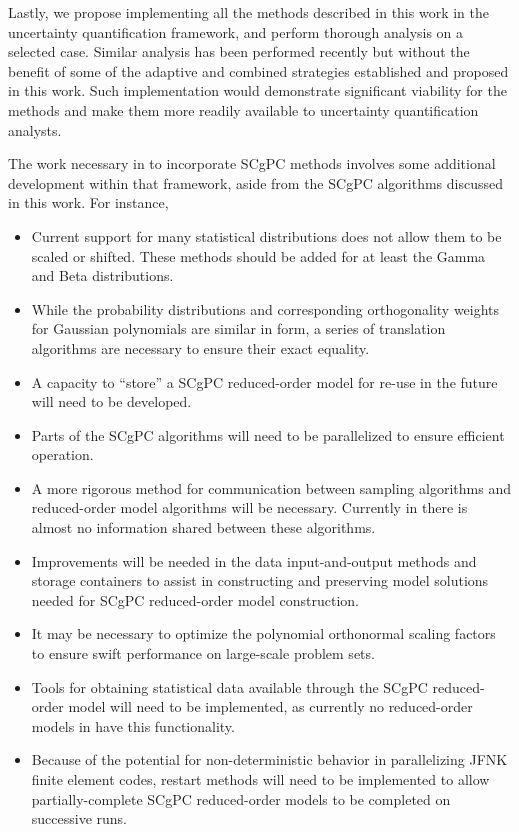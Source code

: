 Lastly, we propose implementing all the methods described in this work in the \raven{} uncertainty
quantification framework, and perform thorough analysis on a selected \bison{} case.  Similar analysis has
been performed recently \cite{bigbison} but without the benefit of some of the adaptive and combined
strategies established and proposed in this work.  Such implementation would demonstrate significant viability
for the methods and make them more readily available to uncertainty quantification analysts.

The work necessary in \raven{} to incorporate SCgPC methods involves some additional development within that
framework, aside from the SCgPC algorithms discussed in this work.  For instance, 
\begin{itemize}
  \item Current \raven{} support for many statistical distributions does not allow them to
be scaled or shifted.  These methods should be added for at least the Gamma and Beta distributions.
  \item While the probability distributions and corresponding orthogonality weights for Gaussian polynomials
    are similar in form, a series of translation algorithms are necessary to ensure their exact equality.
  \item A capacity to ``store'' a SCgPC reduced-order model for re-use in the future will need to be
    developed.
  \item Parts of the SCgPC algorithms will need to be parallelized to ensure efficient operation.
  \item A more rigorous method for communication between sampling algorithms and reduced-order model
    algorithms will be necessary.  Currently in \raven{} there is almost no information shared between these
    algorithms.
  \item Improvements will be needed in the data input-and-output methods and storage containers to assist in
    constructing and preserving model solutions needed for SCgPC reduced-order model construction.
  \item It may be necessary to optimize the polynomial orthonormal scaling factors to ensure swift performance
    on large-scale problem sets.
  \item Tools for obtaining statistical data available through the SCgPC reduced-order model will need to be
    implemented, as currently no reduced-order models in \raven{} have this functionality.
  \item Because of the potential for non-deterministic behavior in parallelizing JFNK finite element codes,
    restart methods will need to be implemented to allow partially-complete SCgPC reduced-order models to be
    completed on successive runs.
\end{itemize}

